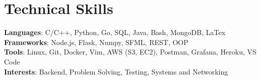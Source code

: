 \documentclass[letterpaper,11pt]{article}
\begin{document}
\section{Technical Skills}
 \begin{itemize}[leftmargin=0.15in, label={}]
    \small{\item{
     \textbf{Languages}{: C/C++, Python, Go, SQL, Java, Bash, MongoDB, LaTex} \\
     \textbf{Frameworks}{: Node.js, Flask, Numpy, SFML, REST, OOP } \\
     \textbf{Tools}{: Linux, Git, Docker, Vim, AWS (S3, EC2), Postman, Grafana, Heroku, VS Code } \\
     \textbf{Interests}{: Backend, Problem Solving, Testing, Systems and Networking } \\
    }}
 \end{itemize}


\end{document}
